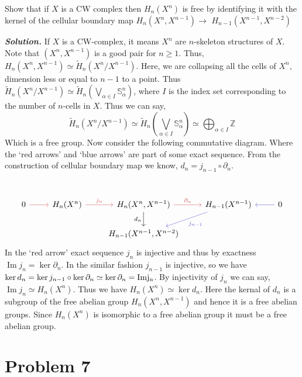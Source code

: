 \documentclass[11pt]{article}
\newcommand{\bb}[1]{\mathbb{#1}}
\newcommand{\Z}{\bb{Z}}
\newcommand{\s}{\bb{S}}
\newcommand{\p}{\partial}
\newcommand{\sol}{ \textbf{\textit{Solution.}} }
\begin{document}
 \begin{prob}{}{}
    Show that if $X$ is a CW complex then $H_{n}\left(X^{n}\right)$ is free by identifying it with the kernel of the cellular boundary map $H_{n}\left(X^{n}, X^{n-1}\right) \rightarrow$ $H_{n-1}\left(X^{n-1}, X^{n-2}\right)$
 \end{prob}

 \sol If $X$ is a CW-complex, it means $X^n$ are $n$-skeleton structures of $X$. Note that $(X^n,X^{n-1})$ is a good pair for $n \geq 1$. Thus, $H_n(X^n,X^{n-1}) \simeq \tilde{H}_n(X^n/X^{n-1})$. Here, we are collapsing all the cells of $X^n$, dimension less or equal to $n-1$ to a point. Thus $\tilde{H}_n(X^n/X^{n-1})\simeq \tilde{H}_n( \bigvee_{\alpha \in I} \s^n_{\alpha})$, where $I$ is the index set corresponding to the number of $n$-cells in $X$. Thus we can say, $$\tilde{H}_n(X^n/X^{n-1})\simeq \tilde{H}_n( \bigvee_{\alpha \in I} \s^n_{\alpha}) \simeq \bigoplus_{\alpha \in I} \Z$$
 Which is a free group. Now consider the following commutative diagram. Where the `red arrows' and `blue arrows' are part of some exact sequence. From the construction of cellular boundary map we know, $d_n = j_{n-1} \circ \p_n$. \[\begin{tikzcd}
	&&&& {} \\
	0 & {H_n(X^n)} & {H_n(X^n,X^{n-1})} & {H_{n-1}(X^{n-1})} & 0 \\
	&& {H_{n-1}(X^{n-1},X^{n-2})}
	\arrow[color={rgb,255:red,214;green,92;blue,92}, from=2-1, to=2-2]
	\arrow["{j_n}", color={rgb,255:red,214;green,92;blue,92}, from=2-2, to=2-3]
	\arrow["{\partial_n}", color={rgb,255:red,214;green,92;blue,92}, from=2-3, to=2-4]
	\arrow["{j_{n-1}}", color={rgb,255:red,92;green,92;blue,214}, from=2-4, to=3-3]
	\arrow[color={rgb,255:red,92;green,92;blue,214}, from=2-5, to=2-4]
	\arrow["{d_n}"', from=2-3, to=3-3]
\end{tikzcd}\]
In the `red arrow' exact sequence $j_n$ is injective and thus by exactness $\operatorname{Im} j_n = \ker \p_n$. In the similar fashion $j_{n-1}$ is injective, so we have $\ker d_n = \ker j_{n-1}\circ \ker \p_n \simeq \ker \p_n = \operatorfont{Im } j_n$. By injectivity of $j_n$ we can say, $\operatorname{Im }j_n \simeq H_n(X^n)$. Thus we have $H_n(X^n) \simeq \ker d_n$. Here the kernal of $d_n$ is a subgroup of the free abelian group $H_n(X^n,X^{n-1})$ and hence it is a free abelian groups. Since $H_n(X^n)$ is isomorphic to a free abelian group it must be a free abelian group. 


 \section{Problem 7}
\end{document}
